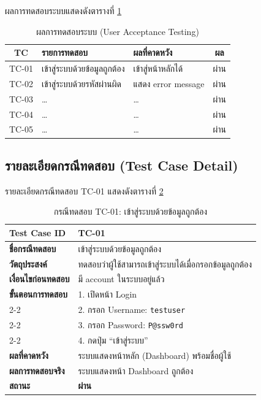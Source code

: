 ผลการทดสอบระบบแสดงดังตารางที่ \ref{tab:test_result}

\begin{table}[H]
\centering
\caption{ผลการทดสอบระบบ (User Acceptance Testing)}
\label{tab:test_result}
\begin{tabular}{|c|l|l|c|}
\hline
\textbf{TC} & \textbf{รายการทดสอบ} & \textbf{ผลที่คาดหวัง} & \textbf{ผล} \\
\hline
TC-01 & เข้าสู่ระบบด้วยข้อมูลถูกต้อง & เข้าสู่หน้าหลักได้ & ผ่าน \\ \hline
TC-02 & เข้าสู่ระบบด้วยรหัสผ่านผิด & แสดง error message & ผ่าน \\ \hline
TC-03 & \ldots & \ldots & ผ่าน \\ \hline
TC-04 & \ldots & \ldots & ผ่าน \\ \hline
TC-05 & \ldots & \ldots & ผ่าน \\
\hline
\end{tabular}
\end{table}


\subsection{รายละเอียดกรณีทดสอบ (Test Case Detail)}

รายละเอียดกรณีทดสอบ TC-01 แสดงดังตารางที่ \ref{tab:tc01}

\begin{table}[H]
\caption{กรณีทดสอบ TC-01: เข้าสู่ระบบด้วยข้อมูลถูกต้อง}
\label{tab:tc01}
\noindent
\begin{tabular}{|l|l|}
\hline
\textbf{Test Case ID} & TC-01 \\ \hline
\textbf{ชื่อกรณีทดสอบ} & เข้าสู่ระบบด้วยข้อมูลถูกต้อง \\ \hline
\textbf{วัตถุประสงค์} & ทดสอบว่าผู้ใช้สามารถเข้าสู่ระบบได้เมื่อกรอกข้อมูลถูกต้อง \\ \hline
\textbf{เงื่อนไขก่อนทดสอบ} & มี account ในระบบอยู่แล้ว \\ \hline
\textbf{ขั้นตอนการทดสอบ} & 1. เปิดหน้า Login \\ \cline{2-2}
 & 2. กรอก Username: \texttt{testuser} \\ \cline{2-2}
 & 3. กรอก Password: \texttt{P@ssw0rd} \\ \cline{2-2}
 & 4. กดปุ่ม ``เข้าสู่ระบบ'' \\ \hline
\textbf{ผลที่คาดหวัง} & ระบบแสดงหน้าหลัก (Dashboard) พร้อมชื่อผู้ใช้ \\ \hline
\textbf{ผลการทดสอบจริง} & ระบบแสดงหน้า Dashboard ถูกต้อง \\ \hline
\textbf{สถานะ} & \textbf{ผ่าน} \\
\hline
\end{tabular}
\end{table}

